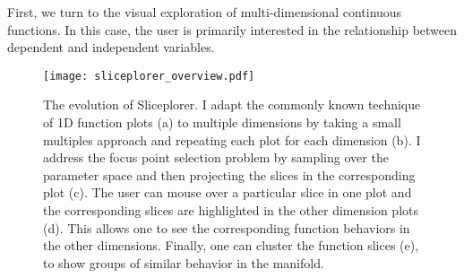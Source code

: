 
First, we turn to the visual exploration of multi-dimensional continuous
functions. In this case, the user is primarily interested in the relationship
between dependent and independent variables. 

\begin{figure}
  \centering
  \texttt{[image: sliceplorer\_overview.pdf]}
  \caption{
    The evolution of Sliceplorer. I adapt the commonly known technique of
    1D function plots (a) to
    multiple dimensions by taking a small multiples approach and repeating each
    plot for each dimension (b). I address the
    focus point selection problem by sampling over the parameter space and then
    projecting the slices in the corresponding plot
    (c). The user can mouse over a particular
    slice in one plot and the corresponding slices are highlighted in the other
    dimension plots (d). This allows one to
    see the corresponding function behaviors in the other dimensions.  Finally,
    one can cluster the function slices (e), to
    show groups of similar behavior in the manifold.
  }
  \label{fig:walkthrough}
\end{figure}











